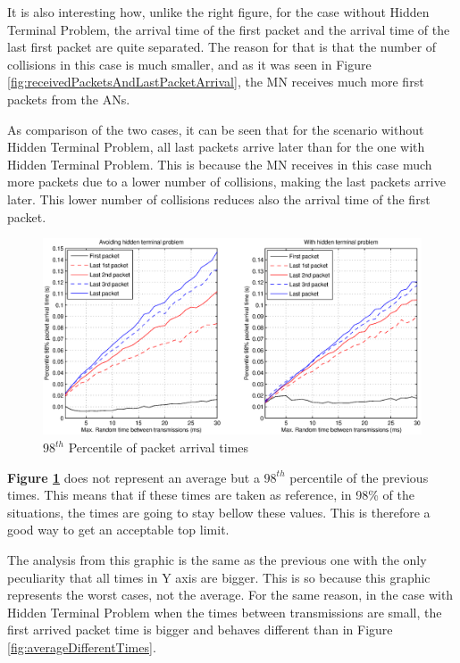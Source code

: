 It is also interesting how, unlike the right figure, for the case without Hidden Terminal Problem, the arrival time of the first packet and the arrival 
time of the last first packet are quite separated. The reason for that is that the number of collisions in this case is much smaller, and as it was seen 
in Figure \ref{fig:receivedPacketsAndLastPacketArrival}, the \ac{MN} receives much more first packets from the \acp{AN}.

As comparison of the two cases, it can be seen that for the scenario without Hidden Terminal Problem, all last packets arrive later than for the
one with Hidden Terminal Problem. This is because the \ac{MN} receives in this case much more packets due to a lower number of collisions, 
making the last packets arrive later. This lower number of collisions reduces also the arrival time of the first packet.

\begin{figure}[ht]
 \begin{center}
  \includegraphics[width=1\textwidth]{percentil98differentTimes.eps}
 \end{center}
 \caption{$98^{th}$ Percentile of packet arrival times}
 \label{fig:percentil98differentTimes}
\end{figure}

\textbf{Figure \ref{fig:percentil98differentTimes}} does not represent an average but a $98^{th}$ percentile of the previous times. This means that 
if these times are taken as reference, in 98\% of the situations, the times are going to stay bellow these values. This is therefore a good way to get 
an acceptable top limit.

The analysis from this graphic is the same as the previous one with the only peculiarity that all times in Y axis are bigger. This is so because
this graphic represents the worst cases, not the average. For the same reason, in the case with Hidden Terminal Problem when the times between
transmissions are small, the first arrived packet time is bigger and behaves different than in Figure \ref{fig:averageDifferentTimes}.

